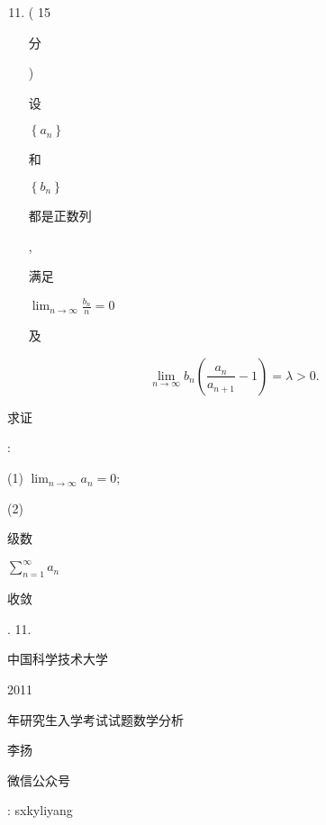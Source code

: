 \documentclass[10pt]{article}
\begin{document}
\begin{enumerate}
  \setcounter{enumi}{10}
  \item ( 15 \begin{CJK}{UTF8}{mj}分\end{CJK}) \begin{CJK}{UTF8}{mj}设\end{CJK} $\left\{a_{n}\right\}$ \begin{CJK}{UTF8}{mj}和\end{CJK} $\left\{b_{n}\right\}$ \begin{CJK}{UTF8}{mj}都是正数列\end{CJK}, \begin{CJK}{UTF8}{mj}满足\end{CJK} $\lim _{n \rightarrow \infty} \frac{b_{n}}{n}=0$ \begin{CJK}{UTF8}{mj}及\end{CJK}
\end{enumerate}
$$
\lim _{n \rightarrow \infty} b_{n}\left(\frac{a_{n}}{a_{n+1}}-1\right)=\lambda>0 .
$$
\begin{CJK}{UTF8}{mj}求证\end{CJK}:

(1) $\lim _{n \rightarrow \infty} a_{n}=0$;

(2) \begin{CJK}{UTF8}{mj}级数\end{CJK} $\sum_{n=1}^{\infty} a_{n}$ \begin{CJK}{UTF8}{mj}收敛\end{CJK}. 11. \begin{CJK}{UTF8}{mj}中国科学技术大学\end{CJK} 2011 \begin{CJK}{UTF8}{mj}年研究生入学考试试题数学分析\end{CJK}

\begin{CJK}{UTF8}{mj}李扬\end{CJK}

\begin{CJK}{UTF8}{mj}微信公众号\end{CJK}: sxkyliyang
\end{document}
